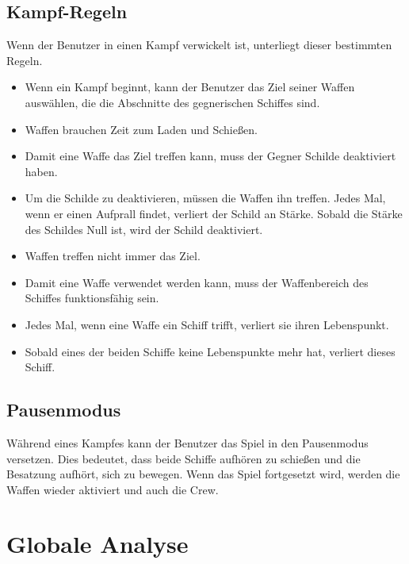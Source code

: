 \documentclass[fontsize=12pt,paper=a4,twoside]{scrartcl}
\begin{document}
\subsection{Kampf-Regeln}
Wenn der Benutzer in einen Kampf verwickelt ist, unterliegt dieser bestimmten Regeln.
\begin{itemize}
\item Wenn ein Kampf beginnt, kann der Benutzer das Ziel seiner Waffen auswählen, die die Abschnitte des gegnerischen Schiffes sind.
 
\item Waffen brauchen Zeit zum Laden und Schießen.

\item Damit eine Waffe das Ziel treffen kann, muss der Gegner Schilde deaktiviert haben.

\item Um die Schilde zu deaktivieren, müssen die Waffen ihn treffen. Jedes Mal, wenn er einen Aufprall findet, verliert der Schild an Stärke. Sobald die Stärke des Schildes Null ist, wird der Schild deaktiviert.

\item Waffen treffen nicht immer das Ziel.

\item Damit eine Waffe verwendet werden kann, muss der Waffenbereich des Schiffes funktionsfähig sein.

\item Jedes Mal, wenn eine Waffe ein Schiff trifft, verliert sie ihren Lebenspunkt.

\item Sobald eines der beiden Schiffe keine Lebenspunkte mehr hat, verliert dieses Schiff.
\end{itemize}
\subsection{Pausenmodus}
Während eines Kampfes kann der Benutzer das Spiel in den Pausenmodus versetzen. Dies bedeutet, dass beide Schiffe aufhören zu schießen und die Besatzung aufhört, sich zu bewegen. Wenn das Spiel fortgesetzt wird, werden die Waffen wieder aktiviert und auch die Crew.
\newpage
\section{Globale Analyse} \label{sec:globale_analyse}
\end{document}
